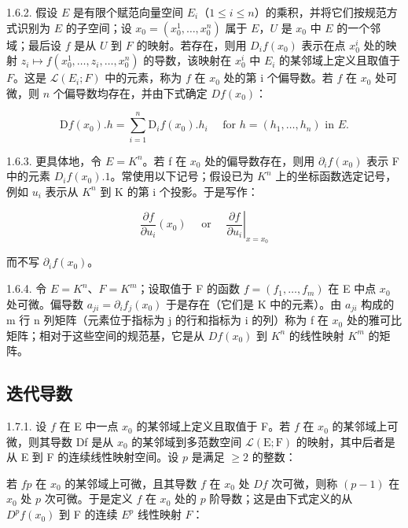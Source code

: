 1.6.2. 假设 \(E\) 是有限个赋范向量空间 \(E_{i}\)（\(1 \leqslant i \leqslant n\)）的乘积，并将它们按规范方式识别为 \(E\) 的子空间；设 \(x_{0} = (x_{0}^{1}, \ldots, x_{0}^{n})\) 属于 \(E\)，\(U\) 是 \(x_{0}\) 中 \(E\) 的一个邻域；最后设 \(f\) 是从 \(U\) 到 \(F\) 的映射。若存在，则用 \(D_{i}f(x_{0})\) 表示在点 \(x_{0}^{i}\) 处的映射 \(z_{i} \mapsto f(x_{0}^{1}, \ldots, z_{i}, \ldots, x_{0}^{n})\) 的导数，该映射在 \(x_{0}^{i}\) 中 \(E_{i}\) 的某邻域上定义且取值于 \(F\)。这是 \(\mathcal{L}(E_{i}; F)\) 中的元素，称为 \(f\) 在 \(x_{0}\) 处的第 i 个偏导数。若 \(f\) 在 \(x_{0}\) 处可微，则 \(n\) 个偏导数均存在，并由下式确定 \(Df(x_{0})\)：

\[
\mathrm{D} f (x _ {0}). h = \sum_ {i = 1} ^ {n} \mathrm{D} _ {i} f (x _ {0}). h _ {i} \quad \text { for } h = (h _ {1}, \dots , h _ {n}) \text { in } E.
\]

1.6.3. 更具体地，令 \(E = K^{n}\)。若 f 在 \(x_{0}\) 处的偏导数存在，则用 \(\partial_{i}f(x_{0})\) 表示 F 中的元素 \(D_{i}f(x_{0}).1\)。常使用以下记号；假设已为 \(K^{n}\) 上的坐标函数选定记号，例如 \(u_{i}\) 表示从 \(K^{n}\) 到 K 的第 i 个投影。于是写作：

\[
\frac {\partial f}{\partial u _ {i}} \left(x _ {0}\right) \quad \text { or } \quad \left. \frac {\partial f}{\partial u _ {i}} \right| _ {x = x _ {0}}
\]

而不写 \(\partial_{i}f(x_{0})\)。

1.6.4. 令 \(E = K^{n}\)、\(F = K^{m}\)；设取值于 F 的函数 \(f = (f_{1}, \ldots, f_{m})\) 在 E 中点 \(x_{0}\) 处可微。偏导数 \(a_{ji} = \partial_{i} f_{j}(x_{0})\) 于是存在（它们是 K 中的元素）。由 \(a_{ji}\) 构成的 m 行 n 列矩阵（元素位于指标为 j 的行和指标为 i 的列）称为 f 在 \(x_{0}\) 处的雅可比矩阵；相对于这些空间的规范基，它是从 \(Df(x_{0})\) 到 \(K^{n}\) 的线性映射 \(K^{m}\) 的矩阵。

\subsection{迭代导数}

1.7.1. 设 \(f\) 在 E 中一点 \(x_{0}\) 的某邻域上定义且取值于 F。若 \(f\) 在 \(x_{0}\) 的某邻域上可微，则其导数 Df 是从 \(x_{0}\) 的某邻域到多范数空间 \(\mathcal{L}(\mathrm{E};\mathrm{F})\) 的映射，其中后者是从 E 到 F 的连续线性映射空间。设 \(p\) 是满足 \(\geqslant 2\) 的整数：

若 \(f\)\(p\) 在 \(x_0\) 的某邻域上可微，且其导数 \(f\) 在 \(x_0\) 处 \(Df\) 次可微，则称 \((p - 1)\) 在 \(x_0\) 处 \(p\) 次可微。于是定义 \(f\) 在 \(x_0\) 处的 \(p\) 阶导数；这是由下式定义的从 \(D^p f(x_0)\) 到 F 的连续 \(E^p\) 线性映射 \(F\)：

